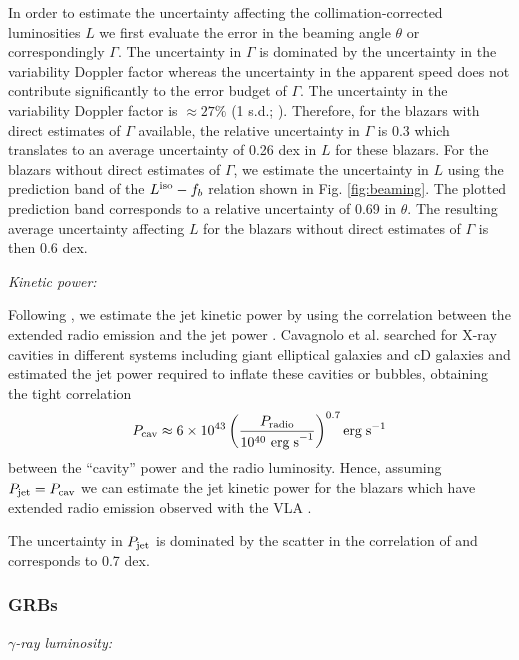 \documentclass[12pt]{article}
\begin{document}
In order to estimate the uncertainty affecting the collimation-corrected luminosities $L$ we first evaluate the error in the beaming angle $\theta$ or correspondingly $\Gamma$.
%
The uncertainty in $\Gamma$ is dominated by the uncertainty in the variability Doppler factor whereas the uncertainty in the apparent speed does not contribute significantly to the error budget of $\Gamma$. The uncertainty in the variability Doppler factor is $\approx 27\%$ (1 s.d.; \emph{}). Therefore, for the blazars with direct estimates of $\Gamma$ available, the relative uncertainty in $\Gamma$ is $0.3$ \cite{shovatta09,spush09} which translates to an average uncertainty of 0.26 dex in $L$ for these blazars.
%
For the blazars without direct estimates of $\Gamma$, we estimate the uncertainty in $L$ using the prediction band of the $L^{\rm iso}-f_b$ relation shown in Fig. \ref{fig:beaming}. The plotted prediction band corresponds to a relative uncertainty of 0.69 in $\theta$. The resulting average uncertainty affecting $L$ for the blazars without direct estimates of $\Gamma$ is then 0.6 dex.


\emph{Kinetic power:}

Following \cite{smeyer11}, we estimate the jet kinetic power by using the correlation between the extended radio emission and the jet power \cite{scava10, ssullivan11}. Cavagnolo et al. searched for X-ray cavities  in different systems including giant elliptical galaxies and cD galaxies and estimated the jet power required to inflate these cavities or bubbles,  obtaining the tight correlation 
\begin{equation}	\label{eq:cava}
P_{\rm cav} \approx 6 \times 10^{43} \left( \frac{P_{\rm radio}}{{10^{40} \ \rm erg \; s}^{-1}} \right)^{0.7} {{\rm erg \; s}^{-1}}
\end{equation}
between the ``cavity'' power and the radio luminosity. Hence, assuming $P_{\rm jet} = P_{\rm cav}$ we can estimate the jet kinetic power for the blazars which have extended radio emission observed with the VLA \cite{smeyer11}.

The uncertainty in $P_{\rm jet}$ is dominated by the scatter in the correlation of \cite{scava10} and corresponds to 0.7 dex.

\subsubsection*{GRBs}

\emph{$\gamma$-ray luminosity:}
\end{document}
